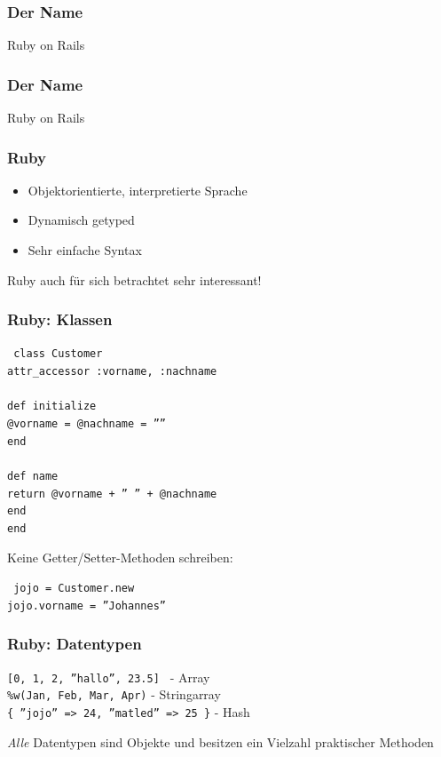 \begin{frame}
  \frametitle{Der Name}
  \begin{center}
    \Huge Ruby on Rails
  \end{center}
\end{frame}

\begin{frame}
  \frametitle{Der Name}
  \begin{center}
    \Huge {\color{red}Ruby} on Rails
  \end{center}
\end{frame}

\begin{frame}
  \frametitle{Ruby}
  \begin{itemize}
    \item Objektorientierte, interpretierte Sprache
    \item Dynamisch getyped
    \item Sehr einfache Syntax
  \end{itemize}
  \begin{center}
    Ruby auch für sich betrachtet sehr interessant!
  \end{center}
\end{frame}

\begin{frame}
  \frametitle{Ruby: Klassen}
  { \tt \small
  class Customer \\
  \enskip attr\_accessor :vorname, :nachname \\
  \enskip \\
  \enskip def initialize \\
  \enskip \enskip @vorname = @nachname = '''' \\
  \enskip end \\
  \enskip \\
  \enskip def name \\
  \enskip \enskip return @vorname + '' '' + @nachname \\
  \enskip end \\
  end \\
  }
  \pause
  \begin{center}
    \small Keine Getter/Setter-Methoden schreiben:
  \end{center}
  { \tt \small
  jojo = Customer.new \\
  jojo.vorname = ''Johannes'' \\
  }
\end{frame}

\begin{frame}
  \frametitle{Ruby: Datentypen}
  { \tt \small [0, 1, 2, ''hallo'', 23.5] } - Array \\
  { \tt \small \%w(Jan, Feb, Mar, Apr)} - Stringarray \\
  { \tt \small \{ ''jojo'' => 24, ''matled'' => 25 \}} - Hash \\
  \vspace{0.3cm}
  \begin{center}
    \emph{Alle} Datentypen sind Objekte und besitzen ein Vielzahl praktischer Methoden
  \end{center}
\end{frame}

